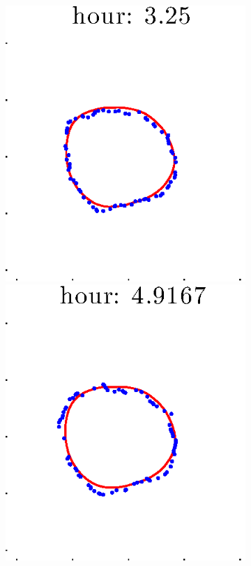 \documentclass[12pt]{article}
\begin{document}
\begin{figure}[h!]
\begin{subfigure}[b]{.3\textwidth}
		\includegraphics[height=.15\textheight]{Pos5exp2/full/second3.eps}
		\includegraphics[height=.15\textheight]{Pos5exp2/full/second4.eps}

\end{subfigure}
\end{figure}
\end{document}
